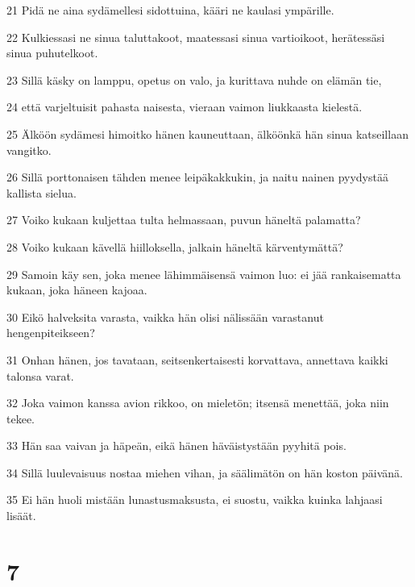 \par 21 Pidä ne aina sydämellesi sidottuina, kääri ne kaulasi ympärille.
\par 22 Kulkiessasi ne sinua taluttakoot, maatessasi sinua vartioikoot, herätessäsi sinua puhutelkoot.
\par 23 Sillä käsky on lamppu, opetus on valo, ja kurittava nuhde on elämän tie,
\par 24 että varjeltuisit pahasta naisesta, vieraan vaimon liukkaasta kielestä.
\par 25 Älköön sydämesi himoitko hänen kauneuttaan, älköönkä hän sinua katseillaan vangitko.
\par 26 Sillä porttonaisen tähden menee leipäkakkukin, ja naitu nainen pyydystää kallista sielua.
\par 27 Voiko kukaan kuljettaa tulta helmassaan, puvun häneltä palamatta?
\par 28 Voiko kukaan kävellä hiilloksella, jalkain häneltä kärventymättä?
\par 29 Samoin käy sen, joka menee lähimmäisensä vaimon luo: ei jää rankaisematta kukaan, joka häneen kajoaa.
\par 30 Eikö halveksita varasta, vaikka hän olisi nälissään varastanut hengenpiteikseen?
\par 31 Onhan hänen, jos tavataan, seitsenkertaisesti korvattava, annettava kaikki talonsa varat.
\par 32 Joka vaimon kanssa avion rikkoo, on mieletön; itsensä menettää, joka niin tekee.
\par 33 Hän saa vaivan ja häpeän, eikä hänen häväistystään pyyhitä pois.
\par 34 Sillä luulevaisuus nostaa miehen vihan, ja säälimätön on hän koston päivänä.
\par 35 Ei hän huoli mistään lunastusmaksusta, ei suostu, vaikka kuinka lahjaasi lisäät.

\chapter{7}

